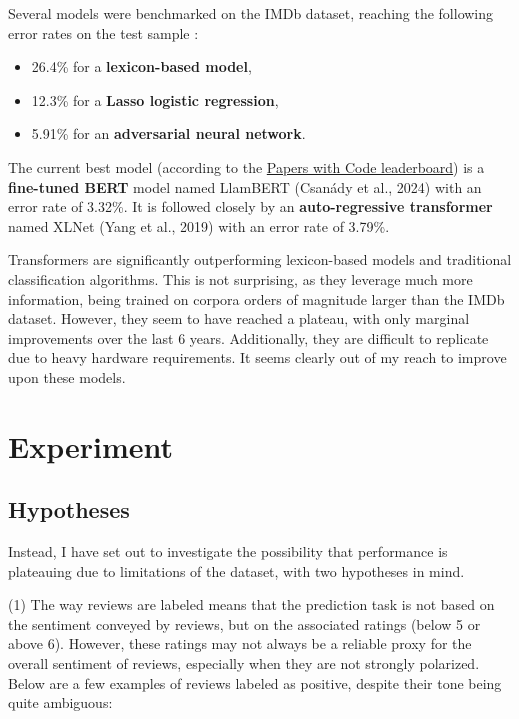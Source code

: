 \documentclass{article}
\begin{document}
Several models were benchmarked on the IMDb dataset, reaching the following error rates on the test sample \citep{stine_sentiment_2019}:
\begin{itemize}
    \item 26.4\% for a \textbf{lexicon-based model},
	\item 12.3\% for a \textbf{Lasso logistic regression},
	\item 5.91\% for an \textbf{adversarial neural network}.
\end{itemize}

The current best model (according to the \href{https://paperswithcode.com/sota/sentiment-analysis-on-imdb}{Papers with Code leaderboard}) is a \textbf{fine-tuned BERT} model named LlamBERT (Csanády et al., 2024) with an error rate of 3.32\%. It is followed closely by an \textbf{auto-regressive transformer} named XLNet (Yang et al., 2019) with an error rate of 3.79\%.

Transformers are significantly outperforming lexicon-based models and traditional classification algorithms. This is not surprising, as they leverage much more information, being trained on corpora orders of magnitude larger than the IMDb dataset. However, they seem to have reached a plateau, with only marginal improvements over the last 6 years. Additionally, they are difficult to replicate due to heavy hardware requirements. It seems clearly out of my reach to improve upon these models.

\section{Experiment}

\subsection{Hypotheses}

Instead, I have set out to investigate the possibility that performance is plateauing due to limitations of the dataset, with two hypotheses in mind.

(1) The way reviews are labeled means that the prediction task is not based on the sentiment conveyed by reviews, but on the associated ratings (below 5 or above 6). However, these ratings may not always be a reliable proxy for the overall sentiment of reviews, especially when they are not strongly polarized. Below are a few examples of reviews labeled as positive, despite their tone being quite ambiguous:
\end{document}
